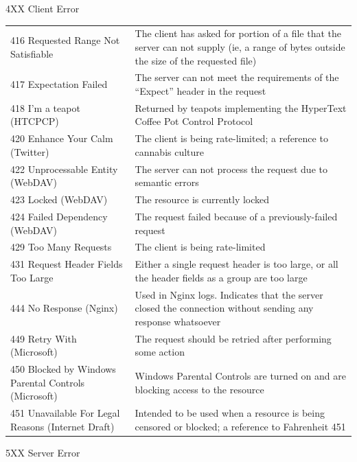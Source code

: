 \documentclass[final]{beamer}
\begin{document}
\begin{frame}{}
\begin{block}{\huge 4XX Client Error}
\begin{tabular}{p{} p{}}
        416 Requested Range Not Satisfiable & The client has asked for portion of a file that the server can not supply (ie, a range of bytes outside the size of the requested file) \\
        417 Expectation Failed & The server can not meet the requirements of the ``Expect'' header in the request \\
        418 I'm a teapot (HTCPCP) & Returned by teapots implementing the HyperText Coffee Pot Control Protocol \\
        420 Enhance Your Calm (Twitter) & The client is being rate-limited; a reference to cannabis culture \\
        422 Unprocessable Entity (WebDAV) & The server can not process the request due to semantic errors \\
        423 Locked (WebDAV) & The resource is currently locked \\
        424 Failed Dependency (WebDAV) & The request failed because of a previously-failed request \\
        429 Too Many Requests & The client is being rate-limited \\
        431 Request Header Fields Too Large & Either a single request header is too large, or all the header fields as a group are too large \\
        444 No Response (Nginx) & Used in Nginx logs. Indicates that the server closed the connection without sending any response whatsoever \\
        449 Retry With (Microsoft) & The request should be retried after performing some action \\
        450 Blocked by Windows Parental Controls (Microsoft) & Windows Parental Controls are turned on and are blocking access to the resource \\
        451 Unavailable For Legal Reasons (Internet Draft) & Intended to be used when a resource is being censored or blocked; a reference to Fahrenheit 451 \\
      \end{tabular}
    \end{block}
    \begin{block}{\huge 5XX Server Error}

      \vspace{0.3in}


\end{block}
\end{frame}
\end{document}
